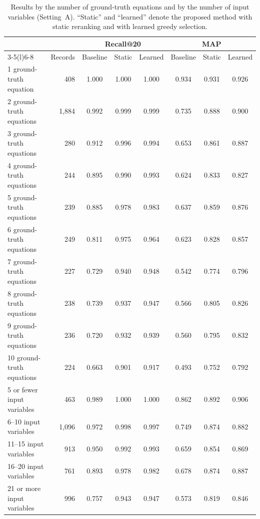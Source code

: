 \begin{table}[h]\centering
\caption{Results by the number of ground-truth equations and by the number of input variables
(Setting~A). ``Static'' and ``learned'' denote the proposed method with static reranking and with
learned greedy selection.}
\label{tab:bucket}
\footnotesize
\setlength{\tabcolsep}{3pt}
\begin{tabular}{@{}lrcccccc@{}}
\toprule
 & & \multicolumn{3}{c}{Recall@20} & \multicolumn{3}{c}{MAP} \\
\cmidrule(lr){3-5}\cmidrule(l){6-8}
 & Records & Baseline & Static & Learned & Baseline & Static & Learned \\
\midrule
1 ground-truth equation & 408 & 1.000 & 1.000 & 1.000 & 0.934 & 0.931 & 0.926 \\
2 ground-truth equations & 1,884 & 0.992 & 0.999 & 0.999 & 0.735 & 0.888 & 0.900 \\
3 ground-truth equations & 280 & 0.912 & 0.996 & 0.994 & 0.653 & 0.861 & 0.887 \\
4 ground-truth equations & 244 & 0.895 & 0.990 & 0.993 & 0.624 & 0.833 & 0.827 \\
5 ground-truth equations & 239 & 0.885 & 0.978 & 0.983 & 0.637 & 0.859 & 0.876 \\
6 ground-truth equations & 249 & 0.811 & 0.975 & 0.964 & 0.623 & 0.828 & 0.857 \\
7 ground-truth equations & 227 & 0.729 & 0.940 & 0.948 & 0.542 & 0.774 & 0.796 \\
8 ground-truth equations & 238 & 0.739 & 0.937 & 0.947 & 0.566 & 0.805 & 0.826 \\
9 ground-truth equations & 236 & 0.720 & 0.932 & 0.939 & 0.560 & 0.795 & 0.832 \\
10 ground-truth equations & 224 & 0.663 & 0.901 & 0.917 & 0.493 & 0.752 & 0.792 \\
\midrule
5 or fewer input variables & 463 & 0.989 & 1.000 & 1.000 & 0.862 & 0.892 & 0.906 \\
6--10 input variables & 1,096 & 0.972 & 0.998 & 0.997 & 0.749 & 0.874 & 0.882 \\
11--15 input variables & 913 & 0.950 & 0.992 & 0.993 & 0.659 & 0.854 & 0.869 \\
16--20 input variables & 761 & 0.893 & 0.978 & 0.982 & 0.678 & 0.874 & 0.887 \\
21 or more input variables & 996 & 0.757 & 0.943 & 0.947 & 0.573 & 0.819 & 0.846 \\
\bottomrule
\end{tabular}
\end{table}

